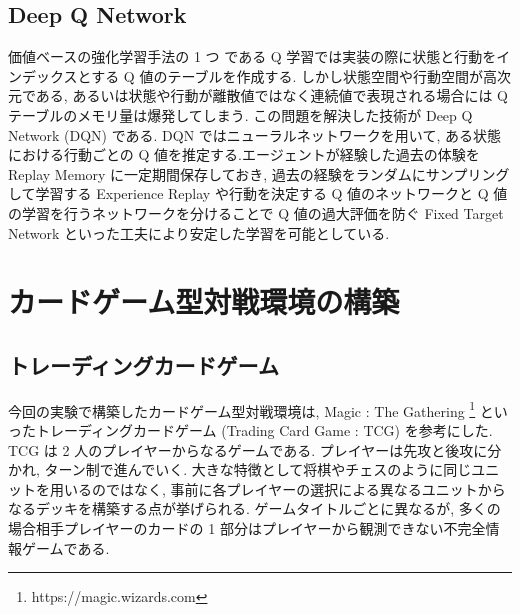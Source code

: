 \documentclass[twocolumn]{jarticle}
\begin{document}
\subsection{Deep Q Network}
価値ベースの強化学習手法の 1 つ である Q 学習では実装の際に状態と行動をインデックスとする Q 値のテーブルを作成する. しかし状態空間や行動空間が高次元である, あるいは状態や行動が離散値ではなく連続値で表現される場合には Q テーブルのメモリ量は爆発してしまう. この問題を解決した技術が Deep Q Network (DQN) \cite{mnih2013atari} である.
 DQN ではニューラルネットワークを用いて, ある状態における行動ごとの Q 値を推定する.エージェントが経験した過去の体験を Replay Memory に一定期間保存しておき, 過去の経験をランダムにサンプリングして学習する Experience Replay や行動を決定する Q 値のネットワークと Q 値の学習を行うネットワークを分けることで Q 値の過大評価を防ぐ Fixed Target Network といった工夫により安定した学習を可能としている.

\section{カードゲーム型対戦環境の構築}
\subsection{トレーディングカードゲーム}
今回の実験で構築したカードゲーム型対戦環境は, Magic : The Gathering \footnote[1]{https://magic.wizards.com} といったトレーディングカードゲーム (Trading Card Game : TCG) を参考にした. TCG は 2 人のプレイヤーからなるゲームである. プレイヤーは先攻と後攻に分かれ, ターン制で進んでいく. 大きな特徴として将棋やチェスのように同じユニットを用いるのではなく, 事前に各プレイヤーの選択による異なるユニットからなるデッキを構築する点が挙げられる. 
ゲームタイトルごとに異なるが, 多くの場合相手プレイヤーのカードの 1 部分はプレイヤーから観測できない不完全情報ゲームである.
\end{document}
